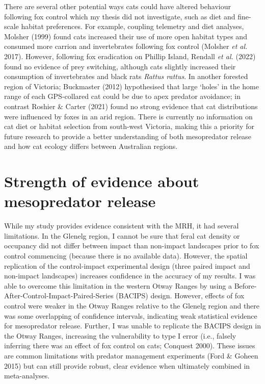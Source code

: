 \documentclass[11pt,a4paper,titlepage,twoside,openright]{style/unimelbthesis}
\begin{document}
\begin{mainmatter}
There are several other potential ways cats could have altered behaviour following fox control which my thesis did not investigate, such as diet and fine-scale habitat preferences. For example, coupling telemetry and diet analyses, Molsher (1999) found cats increased their use of more open habitat types and consumed more carrion and invertebrates following fox control (Molsher \emph{et al.} 2017). However, following fox eradication on Phillip Island, Rendall \emph{et al.} (2022) found no evidence of prey switching, although cats slightly increased their consumption of invertebrates and black rats \emph{Rattus rattus}. In another forested region of Victoria; Buckmaster (2012) hypothesised that large `holes' in the home range of each GPS-collared cat could be due to apex predator avoidance; in contrast Roshier \& Carter (2021) found no strong evidence that cat distributions were influenced by foxes in an arid region. There is currently no information on cat diet or habitat selection from south-west Victoria, making this a priority for future research to provide a better understanding of both mesopredator release and how cat ecology differs between Australian regions.

\hypertarget{strength-of-evidence-about-mesopredator-release}{%
\section{Strength of evidence about mesopredator release}\label{strength-of-evidence-about-mesopredator-release}}

While my study provides evidence consistent with the MRH, it had several limitations. In the Glenelg region, I cannot be sure that feral cat density or occupancy did not differ between impact than non-impact landscapes prior to fox control commencing (because there is no available data). However, the spatial replication of the control-impact experimental design (three paired impact and non-impact landscapes) increases confidence in the accuracy of my results. I was able to overcome this limitation in the western Otway Ranges by using a Before-After-Control-Impact-Paired-Series (BACIPS) design. However, effects of fox control were weaker in the Otway Ranges relative to the Glenelg region and there was some overlapping of confidence intervals, indicating weak statistical evidence for mesopredator release. Further, I was unable to replicate the BACIPS design in the Otway Ranges, increasing the vulnerability to type I error (i.e., falsely inferring there was an effect of fox control on cats; Conquest 2000). These issues are common limitations with predator management experiments (Ford \& Goheen 2015) but can still provide robust, clear evidence when ultimately combined in meta-analyses.


\end{mainmatter}
\end{document}
